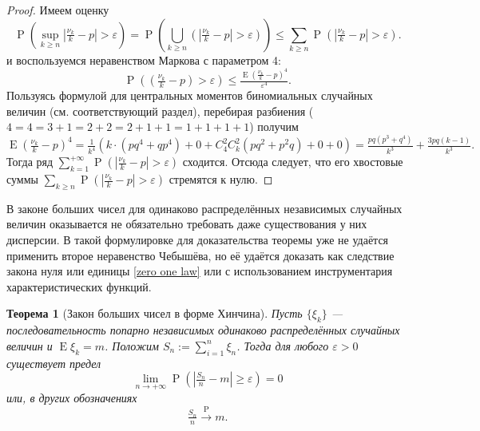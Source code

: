 \documentclass[12pt]{article}
\newtheorem{theorem}{Теорема}
\numberwithin{theorem}{section}
\theoremstyle{definition}
\newcommand{\prob}{\operatorname{P}}
\newcommand{\expect}{\operatorname{E}}
\begin{document}
	\begin{proof}
		Имеем оценку
		$$ \prob(\sup\limits_{k \geqslant n} \left|\tfrac{\nu_k}{k} - p\right| > \varepsilon)
		= \prob(\bigcup\limits_{k \geqslant n} (\left|\tfrac{\nu_k}{k} - p\right| > \varepsilon))
		\leqslant \sum\limits_{k \geqslant n} \prob(\left|\tfrac{\nu_k}{k} - p\right| > \varepsilon). $$
		и воспользуемся неравенством Маркова с параметром 4:
		$$ \prob(\left(\tfrac{\nu_k}{k} - p\right) > \varepsilon) \leqslant 
		\tfrac{\expect\left(\tfrac{\nu_k}{k} - p\right)^4}{\varepsilon^4}. $$
		Пользуясь формулой для центральных моментов биномиальных случайных величин (см. соответствующий раздел),
		перебирая разбиения ($ 4 = 4 = 3 + 1 = 2 + 2 = 2 + 1 + 1 = 1 + 1 + 1 + 1 $) получим
		$$ \expect\left(\tfrac{\nu_k}{k} - p\right)^4
		= \tfrac{1}{k^4}(k\cdot(pq^4 + qp^4) + 0 + C_{4}^{2}C_k^2(pq^2 + p^2q) + 0 + 0)
		= \tfrac{pq(p^3 + q^4)}{k^3} + \tfrac{3pq(k - 1)}{k^3}. $$
		Тогда ряд $ \sum\limits_{k = 1}^{+\infty} \prob(\left|\tfrac{\nu_k}{k} - p\right| > \varepsilon) $
		сходится. Отсюда следует, что его хвостовые суммы
		$ \sum\limits_{k \geqslant n} \prob(\left|\tfrac{\nu_k}{k} - p\right| > \varepsilon) $
		стремятся к нулю.
	\end{proof}
	
	В законе больших чисел для одинаково распределённых независимых случайных величин 
	оказывается не обязательно требовать даже существования у них дисперсии.
	В такой формулировке для доказательства теоремы уже не удаётся применить второе неравенство Чебышёва,
	но её удаётся доказать как следствие закона нуля или единицы \ref{zero one law}	
	или с использованием инструментария характеристических функций.
	
	\begin{theorem}[Закон больших чисел в форме Хинчина] \label{large numbers law | only expectation}
		Пусть $ \{\xi_k\} $ --- последовательность попарно независимых
		одинаково распределённых случайных величин и $ \expect\xi_k = m $. 
		Положим $ S_n := \sum\limits_{i = 1}^{n} \xi_n $.
		Тогда для любого $ \varepsilon > 0 $ существует предел
		$$ \lim\limits_{n \to +\infty} \prob(|\tfrac{S_n}{n} - m| \geqslant \varepsilon) = 0 $$ 
		или, в других обозначениях 
		$$ \tfrac{S_n}{n} \overset{\prob}{\to} m. $$
	\end{theorem}
	
\end{document}
